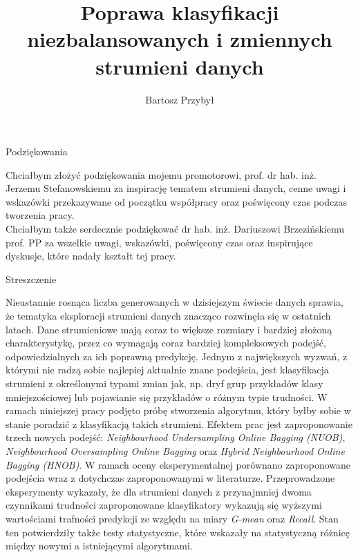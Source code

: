\documentclass[polish,master,a4paper,oneside,11pt]{ppfcmthesis}
\author{%
   Bartosz Przybył \album{136785}}
\title{Poprawa klasyfikacji niezbalansowanych i zmiennych strumieni danych}
\begin{document}
\frontmatter\pagestyle{empty}%
\maketitle\cleardoublepage%

\newpage\null\thispagestyle{empty}\newpage
\begin{center}
    \huge Podziękowania
\end{center}
Chciałbym złożyć podziękowania mojemu promotorowi, prof. dr hab. inż. Jerzemu Stefanowskiemu za inspirację tematem strumieni danych, cenne uwagi i wskazówki przekazywane od początku współpracy oraz poświęcony czas podczas tworzenia pracy.\\

\noindent Chciałbym także serdecznie podziękować dr hab. inż. Dariuszowi Brzezińskiemu prof. PP za wszelkie uwagi, wskazówki, poświęcony czas oraz inspirujące dyskusje, które nadały kształt tej pracy.


\newpage\null\thispagestyle{empty}\newpage
\newpage
\begin{center}
    \huge Streszczenie
\end{center}
Nieustannie rosnąca liczba generowanych w dzisiejszym świecie danych sprawia, że tematyka eksploracji strumieni danych znacząco rozwinęła się w ostatnich latach. Dane strumieniowe mają coraz to większe rozmiary i bardziej złożoną charakterystykę, przez co wymagają coraz bardziej kompleksowych podejść, odpowiedzialnych za ich poprawną predykcję. Jednym z największych wyzwań, z którymi nie radzą sobie najlepiej aktualnie znane podejścia, jest klasyfikacja strumieni z określonymi typami zmian jak, np. dryf grup przykładów klasy mniejszościowej lub pojawianie się przykładów o różnym typie trudności. W ramach niniejszej pracy podjęto próbę stworzenia algorytmu, który byłby sobie w stanie poradzić z klasyfikacją takich strumieni. Efektem prac jest zaproponowanie trzech nowych podejść: \textit{Neighbourhood Undersampling Online Bagging (NUOB)}, \textit{Neighbourhood Oversampling Online Bagging} oraz \textit{Hybrid Neighbourhood Online Bagging (HNOB)}. W ramach oceny eksperymentalnej porównano zaproponowane podejścia wraz z dotychczas zaproponowanymi w literaturze. Przeprowadzone eksperymenty wykazały, że dla strumieni danych z przynajmniej dwoma czynnikami trudności zaproponowane klasyfikatory wykazują się wyższymi wartościami trafności predykcji ze względu na miary \textit{G-mean} oraz \textit{Recall}. Stan ten potwierdziły także testy statystyczne, które wskazały na statystyczną różnicę między nowymi a istniejącymi algorytmami.\\\\
\end{document}
